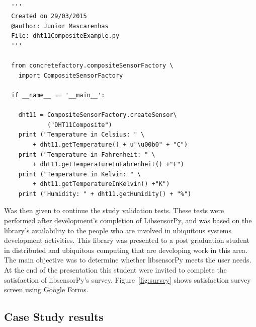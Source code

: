\documentclass{acm_proc_article-sp}
\begin{document}
\renewcommand{\theFancyVerbLine}{
  \sffamily\textcolor[rgb]{0.5,0.5,0.5}{\scriptsize\arabic{FancyVerbLine}}}
\begin{verbatim}

  '''
  Created on 29/03/2015
  @author: Junior Mascarenhas
  File: dht11CompositeExample.py
  '''
  
  from concretefactory.compositeSensorFactory \
  	import CompositeSensorFactory

  if __name__ == '__main__':

    dht11 = CompositeSensorFactory.createSensor\
    	    ("DHT11Composite")
    print ("Temperature in Celsius: " \
    	+ dht11.getTemperature() + u"\u00b0" + "C")
    print ("Temperature in Fahrenheit: " \
    	+ dht11.getTemperatureInFahrenheit() +"F")
    print ("Temperature in Kelvin: " \
    	+ dht11.getTemperatureInKelvin() +"K")
    print ("Humidity: " + dht11.getHumidity() + "%")
\end{verbatim}
Was then given to continue the study validation tests. These tests were performed after development's completion of LibsensorPy, and was based on the library's availability to the people who are involved in ubiquitous systems development activities.
\newline
\newline
This library was presented to a post graduation student in distributed and ubiquitous computing that are developing work in this area. The main objective was to determine whether libsensorPy meets the user needs.
\newline
\newline
At the end of the presentation this student were invited to complete the satisfaction of libsensorPy's survey. Figure~\ref{fig:survey} shows satisfaction survey screen using Google Forms.


\subsection{Case Study results}
\end{document}
